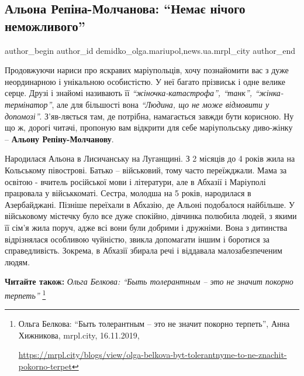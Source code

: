  
 
 
 
 
 
\subsection{Альона Репіна-Молчанова: \enquote{Немає нічого неможливого}}
\label{sec:25_11_2019.stz.news.ua.mrpl_city.1.aljona_repina_molchanova}
 
\ifcmt
 author_begin
   author_id demidko_olga.mariupol,news.ua.mrpl_city
 author_end
\fi


Продовжуючи нариси про яскравих маріупольців, хочу познайомити вас з дуже
неординарною і унікальною особистістю. У неї багато прізвиськ і одне велике
серце. Друзі і знайомі називають її \emph{\enquote{жіночка-катастрофа}, \enquote{танк},
\enquote{жінка-термінатор}}, але для більшості вона \emph{\enquote{Людина, що не може відмовити у
допомозі}}. З'яв\hyp{}ляється там, де потрібна, намагається завжди бути корисною. Ну
що ж, дорогі читачі, пропоную вам відкрити для себе маріупольську диво-жінку –
\textbf{Альону Репіну-Молчанову}.

Народилася Альона в Лисичанську на Луганщині. З 2 місяців до 4 років жила на
Кольському півострові. Батько – військовий, тому часто переїжджали. Мама за
освітою - вчитель російської мови і літератури, але в Абхазії і Маріуполі
працювала у військкоматі. Сестра, молодша на 5 років, народилася в
Азербайджані. Пізніше переїхали в Абхазію, де Альоні подобалося найбільше. У
військовому містечку було все дуже спокійно, дівчинка полюбила людей, з якими
її сім'я жила поруч, адже всі вони були добрими і дружніми. Вона з дитинства
відрізнялася особливою чуйністю, звикла допомагати іншим і боротися за
справедливість. Зокрема, в Абхазії збирала речі і віддавала малозабезпеченим
людям.

\textbf{Читайте також:} \emph{Ольга Белкова: \enquote{Быть толерантным – это не значит покорно терпеть}}%
\footnote{Ольга Белкова: \enquote{Быть толерантным – это не значит покорно терпеть}, Анна Хижникова, mrpl.city, 16.11.2019, \par%
\url{https://mrpl.city/blogs/view/olga-belkova-byt-tolerantnyme-to-ne-znachit-pokorno-terpet}%
}

